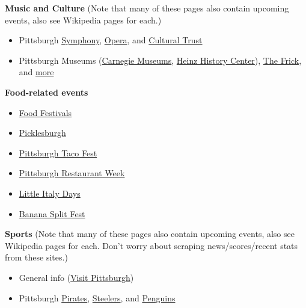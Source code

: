 \documentclass[11pt]{article}
\begin{document}
\vspace{0.4em}
\noindent\textbf{Music and Culture} (Note that many of these pages also contain upcoming events, also
see Wikipedia pages for each.)
\begin{itemize}[nosep, leftmargin=2em]
  \item Pittsburgh \href{https://www.pittsburghsymphony.org}{Symphony},
    \href{https://pittsburghopera.org}{Opera}, and \href{https://trustarts.org}{Cultural Trust}
  \item Pittsburgh Museums (\href{https://carnegiemuseums.org}{Carnegie Museums},
    \href{https://www.heinzhistorycenter.org}{Heinz History Center}),
    \href{https://www.thefrickpittsburgh.org}{The Frick}, and
    \href{https://en.wikipedia.org/wiki/List_of_museums_in_Pittsburgh}{more}
\end{itemize}

\vspace{0.4em}
\noindent\textbf{Food-related events}
\begin{itemize}[nosep, leftmargin=2em]
  \item \href{https://www.visitpittsburgh.com/events-festivals/food-festivals/}{Food Festivals}
  \item \href{https://www.picklesburgh.com/}{Picklesburgh}
  \item \href{https://www.pghtacofest.com/}{Pittsburgh Taco Fest}
  \item \href{https://pittsburghrestaurantweek.com/}{Pittsburgh Restaurant Week}
  \item \href{https://littleitalydays.com}{Little Italy Days}
  \item \href{https://bananasplitfest.com}{Banana Split Fest}
\end{itemize}

\vspace{0.4em}
\noindent\textbf{Sports} (Note that many of these pages also contain upcoming events, also see
Wikipedia pages for each. Don't worry about scraping news/scores/recent stats from these sites.)
\begin{itemize}[nosep, leftmargin=2em]
  \item General info
    (\href{https://www.visitpittsburgh.com/things-to-do/pittsburgh-sports-teams/}{Visit Pittsburgh})
  \item Pittsburgh \href{https://www.mlb.com/pirates}{Pirates},
    \href{https://www.steelers.com}{Steelers}, and \href{https://www.nhl.com/penguins/}{Penguins}
\end{itemize}
\end{document}
